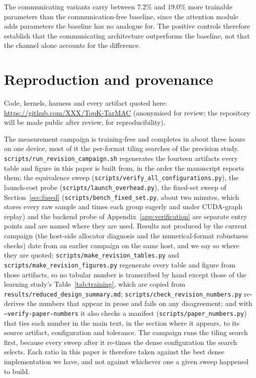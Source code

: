 The communicating variants carry between $7.2\%$ and $19.0\%$ more trainable
parameters than the communication-free baseline, since the attention module adds
parameters the baseline has no analogue for. The positive controls therefore
establish that the communicating architecture outperforms the baseline, not that
the channel alone accounts for the difference.

\section{Reproduction and provenance}
\label{app:repro}

Code, kernels, harness and every artifact quoted here:
\url{https://github.com/XXX/TopK-TarMAC} (anonymised for review; the repository
will be made public after review, for reproducibility).

The measurement campaign is training-free and completes in about three hours on
one device, most of it the per-format tiling searches of the precision study.
\texttt{scripts/run\_revision\_campaign.sh} regenerates the fourteen
artifacts every table and figure in this paper is built from, in the order the
manuscript reports them; the equivalence sweep
(\texttt{scripts/verify\_all\_configurations.py}), the launch-cost probe (\texttt{scripts/launch\_overhead.py}), the fixed-set sweep of Section~\ref{sec:fused} (\texttt{scripts/bench\_fixed\_set.py}, about two minutes, which stores every raw sample and times each group eagerly and under CUDA-graph replay) and the backend probe of Appendix~\ref{app:verification} are separate entry points and are named where they are used. Results not produced by the current campaign (the host-side
allocator diagnosis and the numerical-format robustness checks) date from an
earlier campaign on the same host, and we say so where they are quoted;
\texttt{scripts/make\_revision\_tables.py} and
\texttt{scripts/make\_revision\_figures.py} regenerate every table and figure
from those artifacts, so no tabular number is transcribed by hand except those of the learning study's Table~\ref{tab:training}, which are copied from \texttt{results/reduced\_design\_summary.md}; \texttt{scripts/check\_revision\_numbers.py} re-derives the numbers that appear in prose and fails on any disagreement; and with \texttt{--verify-paper-numbers} it also checks a manifest (\texttt{scripts/paper\_numbers.py}) that ties each number in the main text, in the section where it appears, to its source artifact, configuration and tolerance. The campaign runs the
tiling search first, because every sweep after it re-times the dense
configuration the search selects. Each ratio in this paper is therefore taken
against the best dense implementation we have, and not against whichever one a
given sweep happened to build.

